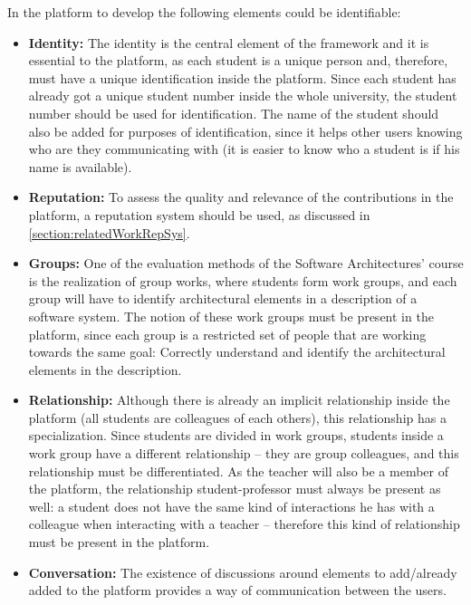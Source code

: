 In the platform to develop the following elements could be identifiable:

\begin{itemize}
\item \textbf{Identity:} The identity is the central element of the framework and it is essential to the platform, as each student is a unique person and, therefore, must have a unique identification inside the platform. Since each student has already got a unique student number inside the whole university, the student number should be used for identification. The name of the student should also be added for purposes of identification, since it helps other users knowing who are they communicating with (it is easier to know who a student is if his name is available).

\item \textbf{Reputation:} To assess the quality and relevance of the contributions in the platform, a reputation system should be used, as discussed in \ref{section:relatedWorkRepSys}.

\item \textbf{Groups:} One of the evaluation methods of the Software Architectures' course is the realization of group works, where students form work groups, and each group will have to identify architectural elements in a description of a software system. The notion of these work groups must be present in the platform, since each group is a restricted set of people that are working towards the same goal: Correctly understand and identify the architectural elements in the description. 

\item \textbf{Relationship:} Although there is already an implicit relationship inside the platform (all students are colleagues of each others), this relationship has a specialization. Since students are divided in work groups, students inside a work group have a different relationship – they are group colleagues, and this relationship must be differentiated. As the teacher will also be a member of the platform, the relationship student-professor must always be present as well: a student does not have the same kind of interactions he has with a colleague when interacting with a teacher – therefore this kind of relationship must be present in the platform.

\item \textbf{Conversation:} The existence of discussions around elements to add/already added to the platform provides a way of communication between the users.


\end{itemize}
